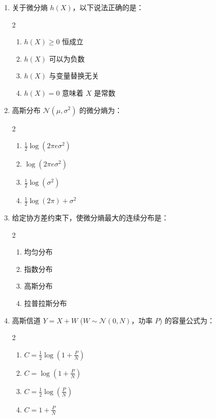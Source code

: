 \documentclass[12pt,a4paper]{ctexart}
\begin{document}
\begin{enumerate}[label=\arabic*., leftmargin=*]

\item 关于微分熵 $h(X)$，以下说法正确的是：
\begin{multicols}{2}
\begin{enumerate}[label=(\Alph*)]
  \item $h(X) \geq 0$ 恒成立
  \item $h(X)$ 可以为负数
  \item $h(X)$ 与变量替换无关
  \item $h(X) = 0$ 意味着 $X$ 是常数
\end{enumerate}
\end{multicols}

\item 高斯分布 $\mathcal{N}(\mu, \sigma^2)$ 的微分熵为：
\begin{multicols}{2}
\begin{enumerate}[label=(\Alph*)]
  \item $\frac{1}{2}\log(2\pi e \sigma^2)$
  \item $\log(2\pi e \sigma^2)$
  \item $\frac{1}{2}\log(\sigma^2)$
  \item $\frac{1}{2}\log(2\pi) + \sigma^2$
\end{enumerate}
\end{multicols}

\item 给定协方差约束下，使微分熵最大的连续分布是：
\begin{multicols}{2}
\begin{enumerate}[label=(\Alph*)]
  \item 均匀分布
  \item 指数分布
  \item 高斯分布
  \item 拉普拉斯分布
\end{enumerate}
\end{multicols}

\item 高斯信道 $Y = X + W$ ($W \sim \mathcal{N}(0,N)$，功率 $P$) 的容量公式为：
\begin{multicols}{2}
\begin{enumerate}[label=(\Alph*)]
  \item $C = \frac{1}{2}\log(1 + \frac{P}{N})$
  \item $C = \log(1 + \frac{P}{N})$
  \item $C = \frac{1}{2}\log(\frac{P}{N})$
  \item $C = 1 + \frac{P}{N}$
\end{enumerate}
\end{multicols}


\end{enumerate}
\end{document}
